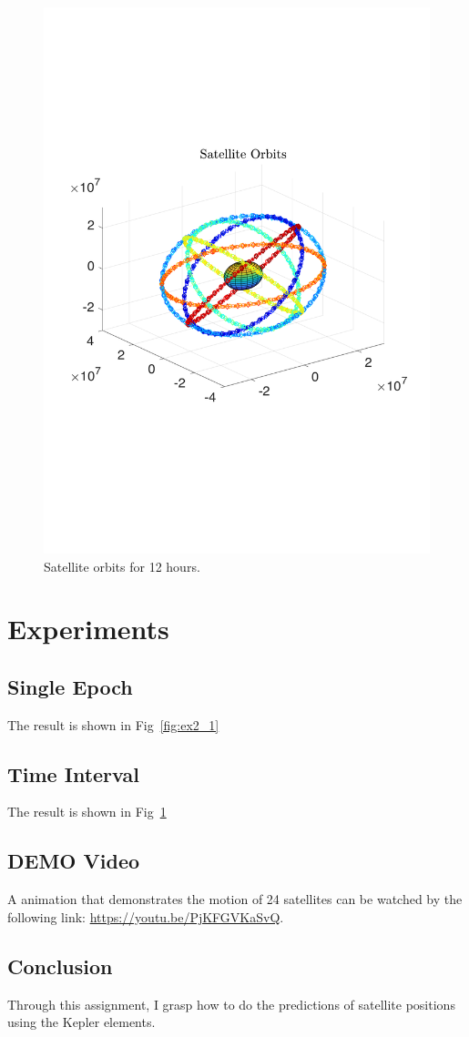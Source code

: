 \begin{figure}[h]
	\centering
	\includegraphics[width=.8\textwidth]{figures/ex22}
	\caption{Satellite orbits for 12 hours.}
	\label{fig:ex2_2}
\end{figure}
\section{Experiments}
\subsection{Single Epoch}
The result is shown in Fig~\ref{fig:ex2_1}
\subsection{Time Interval}
The result is shown in Fig~\ref{fig:ex2_2}
\subsection{DEMO Video}
A animation that demonstrates the motion of 24 satellites can be watched by the following link: \url{https://youtu.be/PjKFGVKaSvQ}.
\subsection{Conclusion}
Through this assignment, I grasp how to do the predictions of satellite positions using the Kepler elements.
